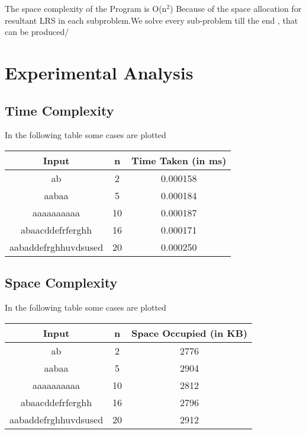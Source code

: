 \documentclass[conference]{IEEEtran}
\begin{document}
The space complexity of the Program is O(n$^{2}$) Because of the space allocation for resultant LRS in each subproblem.We solve every sub-problem till the end , that can be produced/

\section{Experimental Analysis}
\subsection{Time Complexity}
In the following table some cases are plotted
\begin{center}
 \begin{tabular}{||c | c | c||} 
 \hline
 Input & n & Time Taken (in ms) \\ [0.5ex] 
 \hline\hline
 ab & 2 & 0.000158 \\ 
 \hline
 aabaa & 5 & 0.000184 \\
 \hline
 aaaaaaaaaa & 10 & 0.000187 \\
 \hline
 abaacddefrferghh & 16 & 0.000171 \\
 \hline
 aabaddefrghhuvdsused & 20 & 0.000250 \\ [1ex] 
 \hline
\end{tabular}
\end{center}


\subsection{Space Complexity}
In the following table some cases are plotted
\begin{center}
 \begin{tabular}{||c | c | c||} 
 \hline
 Input & n & Space Occupied (in KB) \\ [0.5ex] 
 \hline\hline
 ab & 2 & 2776 \\ 
 \hline
 aabaa & 5 & 2904 \\
 \hline
 aaaaaaaaaa & 10 & 2812 \\
 \hline
 abaacddefrferghh & 16 & 2796 \\
 \hline
 aabaddefrghhuvdsused & 20 & 2912 \\ [1ex] 
 \hline
\end{tabular}
\end{center}
\end{document}
